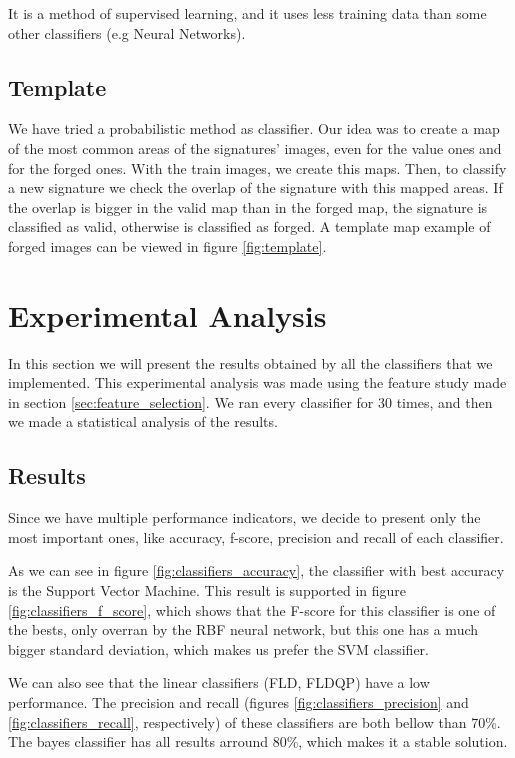 \documentclass[12pt,a4paper]{report}
\begin{document}
			It is a method of supervised learning, and it uses less training data than some other classifiers (e.g Neural Networks).
			
			
			\subsection{Template}
			We have tried a probabilistic method as classifier. Our idea was to create a map of the most common areas of the signatures' images, even for the value ones and for the forged ones. With the train images, we create this maps. Then, to classify a new signature we check the overlap of the signature with this mapped areas. If the overlap is bigger in the valid map than in the forged map, the signature is classified as valid, otherwise is classified as forged. A template map example of forged images can be viewed in figure \ref{fig:template}.
			
			
			
			
			\section{Experimental Analysis}
			In this section we will present the results obtained by all the classifiers that we implemented. This experimental analysis was made using the feature study made in section \ref{sec:feature_selection}. We ran every classifier for 30 times, and then we made a statistical analysis of the results.
				\subsection{Results}
				Since we have multiple performance indicators, we decide to present only the most important ones, like  accuracy,  f-score, precision and recall of each classifier.
				
				As we can see in figure \ref{fig:classifiers_accuracy}, the classifier with best accuracy is the Support Vector Machine. This result is supported in figure \ref{fig:classifiers_f_score}, which shows that the F-score for this classifier is one of the bests, only overran by the RBF neural network, but this one has a much bigger standard deviation, which makes us prefer the SVM classifier.
				
				
				We can also see that the linear classifiers (FLD, FLDQP) have a low performance. The precision and recall (figures \ref{fig:classifiers_precision} and \ref{fig:classifiers_recall}, respectively) of these classifiers are both bellow than 70\%. The bayes classifier has all results arround 80\%, which makes it a stable solution.
				
\end{document}
